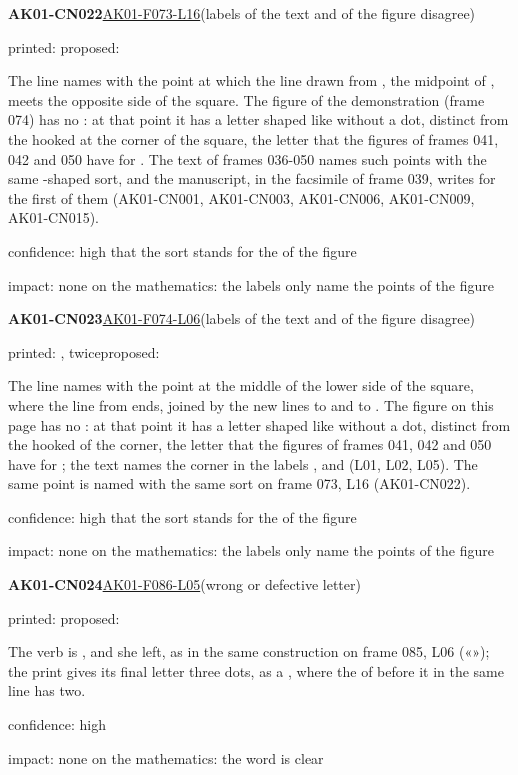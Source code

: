 \documentclass[11pt]{article}
\begin{document}
\noindent\textbf{AK01-CN022}\enspace\hyperlink{AK01-F073-L16}{AK01-F073-L16}\enspace(labels of the text and of the figure disagree)\par\noindent printed: \enspace proposed: \par\noindent The line names with  the point at which the line drawn from , the midpoint of , meets the opposite side of the square. The figure of the demonstration (frame 074) has no : at that point it has a letter shaped like  without a dot, distinct from the hooked  at the corner of the square, the letter that the figures of frames 041, 042 and 050 have for . The text of frames 036-050 names such points with the same -shaped sort, and the manuscript, in the facsimile of frame 039, writes  for the first of them (AK01-CN001, AK01-CN003, AK01-CN006, AK01-CN009, AK01-CN015).\par\noindent confidence: high that the sort stands for the  of the figure\par\noindent impact: none on the mathematics: the labels only name the points of the figure\par\medskip
\noindent\textbf{AK01-CN023}\enspace\hyperlink{AK01-F074-L06}{AK01-F074-L06}\enspace(labels of the text and of the figure disagree)\par\noindent printed: , twice\enspace proposed: \par\noindent The line names with  the point at the middle of the lower side of the square, where the line from  ends, joined by the new lines to  and to . The figure on this page has no : at that point it has a letter shaped like  without a dot, distinct from the hooked  of the corner, the letter that the figures of frames 041, 042 and 050 have for ; the text names the corner  in the labels ,  and  (L01, L02, L05). The same point is named with the same sort on frame 073, L16 (AK01-CN022).\par\noindent confidence: high that the sort stands for the  of the figure\par\noindent impact: none on the mathematics: the labels only name the points of the figure\par\medskip
\noindent\textbf{AK01-CN024}\enspace\hyperlink{AK01-F086-L05}{AK01-F086-L05}\enspace(wrong or defective letter)\par\noindent printed: \enspace proposed: \par\noindent The verb is , and she left, as in the same construction on frame 085, L06 («»); the print gives its final letter three dots, as a , where the  of  before it in the same line has two.\par\noindent confidence: high\par\noindent impact: none on the mathematics: the word is clear\par\medskip
\end{document}
